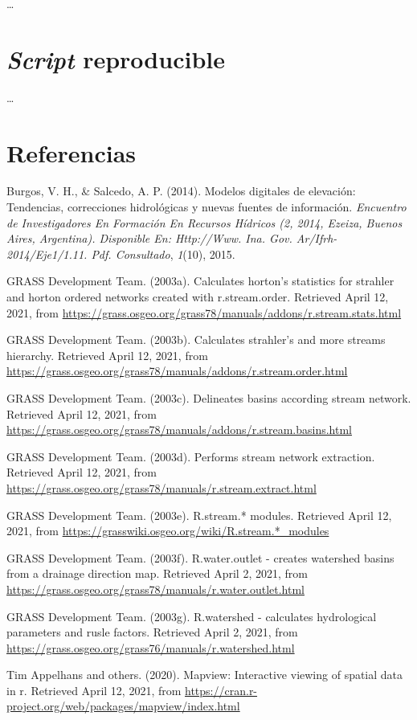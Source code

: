 \documentclass[11pt,]{article}
\begin{document}
\ldots

\section{\texorpdfstring{\emph{Script}
reproducible}{Script reproducible}}\label{script-reproducible}

\ldots

\section*{Referencias}\label{referencias}

\hypertarget{refs}{}
\hypertarget{ref-burgos2014modelos}{}
Burgos, V. H., \& Salcedo, A. P. (2014). Modelos digitales de elevación:
Tendencias, correcciones hidrológicas y nuevas fuentes de información.
\emph{Encuentro de Investigadores En Formación En Recursos Hídricos (2,
2014, Ezeiza, Buenos Aires, Argentina). Disponible En: Http://Www. Ina.
Gov. Ar/Ifrh-2014/Eje1/1.11. Pdf. Consultado}, \emph{1}(10), 2015.

\hypertarget{ref-addonrstreamstats}{}
GRASS Development Team. (2003a). Calculates horton's statistics for
strahler and horton ordered networks created with r.stream.order.
Retrieved April 12, 2021, from
\url{https://grass.osgeo.org/grass78/manuals/addons/r.stream.stats.html}

\hypertarget{ref-addonrstreamorder}{}
GRASS Development Team. (2003b). Calculates strahler's and more streams
hierarchy. Retrieved April 12, 2021, from
\url{https://grass.osgeo.org/grass78/manuals/addons/r.stream.order.html}

\hypertarget{ref-addonrstreambasins}{}
GRASS Development Team. (2003c). Delineates basins according stream
network. Retrieved April 12, 2021, from
\url{https://grass.osgeo.org/grass78/manuals/addons/r.stream.basins.html}

\hypertarget{ref-addonrstreamextract}{}
GRASS Development Team. (2003d). Performs stream network extraction.
Retrieved April 12, 2021, from
\url{https://grass.osgeo.org/grass78/manuals/r.stream.extract.html}

\hypertarget{ref-addonrstream}{}
GRASS Development Team. (2003e). R.stream.* modules. Retrieved April 12,
2021, from \url{https://grasswiki.osgeo.org/wiki/R.stream.*_modules}

\hypertarget{ref-addonrwateroutlet}{}
GRASS Development Team. (2003f). R.water.outlet - creates watershed
basins from a drainage direction map. Retrieved April 2, 2021, from
\url{https://grass.osgeo.org/grass78/manuals/r.water.outlet.html}

\hypertarget{ref-addonrwater}{}
GRASS Development Team. (2003g). R.watershed - calculates hydrological
parameters and rusle factors. Retrieved April 2, 2021, from
\url{https://grass.osgeo.org/grass76/manuals/r.watershed.html}

\hypertarget{ref-mapview}{}
Tim Appelhans and others. (2020). Mapview: Interactive viewing of
spatial data in r. Retrieved April 12, 2021, from
\url{https://cran.r-project.org/web/packages/mapview/index.html}




\newpage
\singlespacing 
\end{document}

